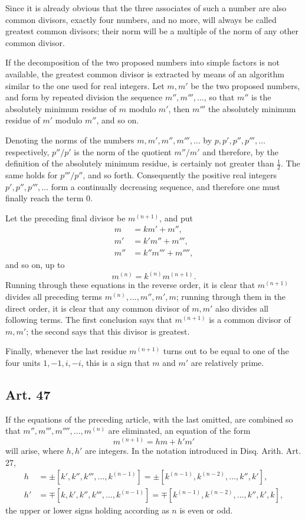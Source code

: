 \documentclass[12pt]{article}
\newcommand{\art}[1]{\subsection*{Art. #1}}
\begin{document}
Since it is already obvious that the three associates of such a number are also common divisors, exactly four numbers, and no more, will always be called greatest common divisors; their norm will be a multiple of the norm of any other common divisor.

If the decomposition of the two proposed numbers into simple factors is not available, the greatest common divisor is extracted by means of an algorithm similar to the one used for real integers. Let $m,m'$ be the two proposed numbers, and form by repeated division the sequence $m'',m''',\ldots$, so that $m''$ is the absolutely minimum residue of $m$ modulo $m'$, then $m'''$ the absolutely minimum residue of $m'$ modulo $m''$, and so on.

Denoting the norms of the numbers $m,m',m'',m''',\ldots$ by $p,p',p'',p''',\ldots$ respectively, $p''/p'$ is the norm of the quotient $m''/m'$ and therefore, by the definition of the absolutely minimum residue, is certainly not greater than $\frac12$. The same holds for $p'''/p''$, and so forth. Consequently the positive real integers $p',p'',p''',\ldots$ form a continually decreasing sequence, and therefore one must finally reach the term $0$.

Let the preceding final divisor be $m^{(n+1)}$, and put
\[
\begin{aligned}
 m&=km'+m'',\\
 m'&=k'm''+m''',\\
 m''&=k''m'''+m'''',
\end{aligned}
\]
and so on, up to
\[
m^{(n)}=k^{(n)}m^{(n+1)}.
\]
Running through these equations in the reverse order, it is clear that $m^{(n+1)}$ divides all preceding terms $m^{(n)},\ldots,m'',m',m$; running through them in the direct order, it is clear that any common divisor of $m,m'$ also divides all following terms. The first conclusion says that $m^{(n+1)}$ is a common divisor of $m,m'$; the second says that this divisor is greatest.

Finally, whenever the last residue $m^{(n+1)}$ turns out to be equal to one of the four units $1,-1,i,-i$, this is a sign that $m$ and $m'$ are relatively prime.

\art{47}
If the equations of the preceding article, with the last omitted, are combined so that $m'',m''',m'''',\ldots,m^{(n)}$ are eliminated, an equation of the form
\[
m^{(n+1)}=hm+h'm'
\]
will arise, where $h,h'$ are integers. In the notation introduced in Disq. Arith. Art. 27,
\[
\begin{aligned}
h&=\pm[k',k'',k''',\ldots,k^{(n-1)}]
=\pm[k^{(n-1)},k^{(n-2)},\ldots,k'',k'],\\
h'&=\mp[k,k',k'',k''',\ldots,k^{(n-1)}]
=\mp[k^{(n-1)},k^{(n-2)},\ldots,k'',k',k],
\end{aligned}
\]
the upper or lower signs holding according as $n$ is even or odd.
\end{document}
